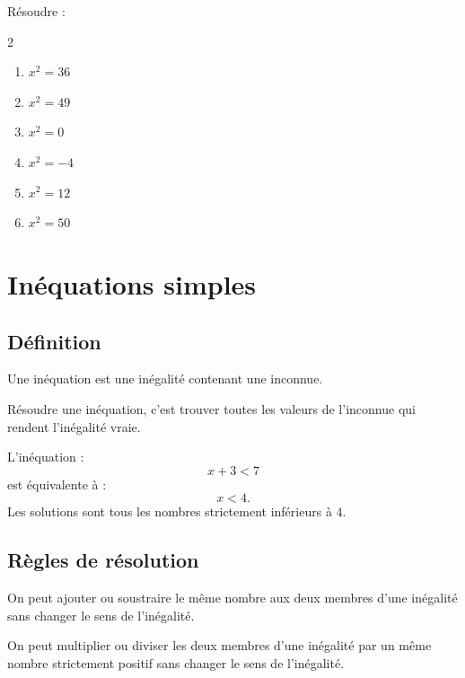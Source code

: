 \documentclass[11pt,a4paper]{article}
\newcounter{exercice}
\begin{document}
\begin{exercice}
Résoudre :
\begin{multicols}{2}
\begin{enumerate}[label=\alph*)]
  \item $x^2=36$
  \item $x^2=49$
  \item $x^2=0$
  \item $x^2=-4$
  \item $x^2=12$
  \item $x^2=50$
\end{enumerate}
\end{multicols}
\end{exercice}

\newpage

\section{Inéquations simples}

\subsection{Définition}

\begin{definitionbox}
Une inéquation est une inégalité contenant une inconnue.

Résoudre une inéquation, c'est trouver toutes les valeurs de l'inconnue qui rendent l'inégalité vraie.
\end{definitionbox}

\begin{exemple}
L'inéquation :
\[
x+3<7
\]
est équivalente à :
\[
x<4.
\]
Les solutions sont tous les nombres strictement inférieurs à $4$.
\end{exemple}

\subsection{Règles de résolution}

\begin{propriete}
On peut ajouter ou soustraire le même nombre aux deux membres d'une inégalité sans changer le sens de l'inégalité.
\end{propriete}

\begin{propriete}
On peut multiplier ou diviser les deux membres d'une inégalité par un même nombre strictement positif sans changer le sens de l'inégalité.
\end{propriete}
\end{document}
